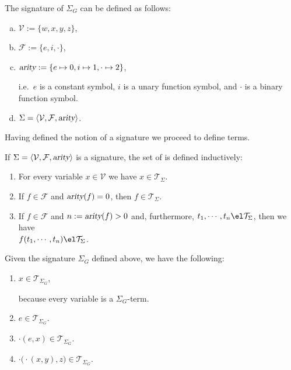 \example
The signature of  $\Sigma_G$ can be defined as follows:
\begin{enumerate}[(a)]
\item $\mathcal{V} := \{ w, x, y, z \}$,
\item $\mathcal{F} := \{ e, i, \cdot \}$,
\item $\textsl{arity} := \{ e \mapsto 0, i \mapsto 1, \cdot \mapsto 2 \}$,
  
      i.e.~$e$ is a constant symbol, $i$ is a unary function symbol, and $\cdot$ is a binary function symbol.
\item $\Sigma = \langle \mathcal{V}, \mathcal{F}, \textsl{arity} \rangle$. \eoxs
\end{enumerate}

\noindent
Having defined the notion of a signature we proceed to define terms.

\begin{Definition}
  If $\Sigma = \langle \mathcal{V}, \mathcal{F}, \textsl{arity} \rangle$ is a signature, the set of
     
   is defined inductively:
  \begin{enumerate}
  \item For every variable $x \in \mathcal{V}$ we have $x \in \mathcal{T}_\Sigma$.
  \item If $f \in \mathcal{F}$ and $\textsl{arity}(f) = 0$, then $f \in \mathcal{T}_\Sigma$.
  \item If $f \in \mathcal{F}$ and $n := \textsl{arity}(f) > 0$ and, furthermore, $t_1,\cdots,t_n \el \mathcal{T}_\Sigma$,  then we have
        \\[0.2cm]
        \hspace*{1.3cm} $f(t_1,\cdots,t_n) \el \mathcal{T}_\Sigma$.
        \eoxs
  \end{enumerate}
\end{Definition}

\example
Given the signature $\Sigma_G$ defined above, we have the following:
\begin{enumerate}
\item $x \in \mathcal{T}_{\Sigma_G}$,
  
      because every variable is a $\Sigma_{G}$-term.
\item $e \in \mathcal{T}_{\Sigma_G}$.
\item $\cdot(e,x) \in \mathcal{T}_{\Sigma_G}$.
\item $\cdot\bigl(\cdot(x,y),z\bigr) \in \mathcal{T}_{\Sigma_G}$.
\end{enumerate}


